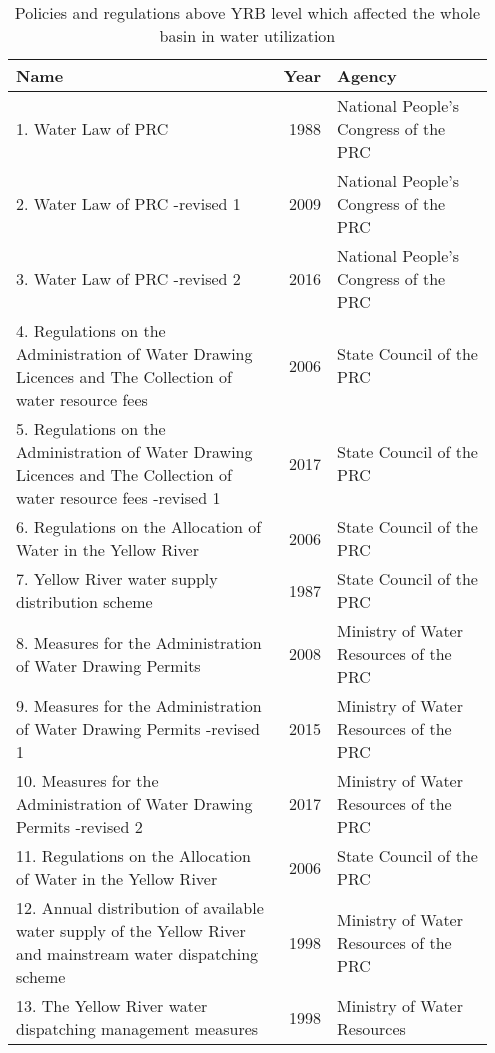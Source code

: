 \begin{table}[!h]
    \centering
    \renewcommand\arraystretch{1.2}
    \caption{Policies and regulations above YRB level which affected the whole basin in water utilization}\label{tab:policies}
    \begin{tabular}{p{0.6\linewidth}rp{0.35\linewidth}}
        Name & Year & Agency \\
        \hline
        1. Water Law of PRC & 1988 & National People's Congress of the PRC \\
        2. Water Law of PRC -revised 1 & 2009 & National People's Congress of the PRC \\
        3. Water Law of PRC -revised 2 & 2016 & National People's Congress of the PRC \\
        4. Regulations on the Administration of Water Drawing Licences and The Collection of water resource fees & 2006 & State Council of the PRC \\
        5. Regulations on the Administration of Water Drawing Licences and The Collection of water resource fees -revised 1 & 2017 & State Council of the PRC \\
        6. Regulations on the Allocation of Water in the Yellow River & 2006 & State Council of the PRC \\
        7. Yellow River water supply distribution scheme & 1987 & State Council of the PRC \\
        8. Measures for the Administration of Water Drawing Permits & 2008 & Ministry of Water Resources of the PRC \\
        9. Measures for the Administration of Water Drawing Permits -revised 1 & 2015 & Ministry of Water Resources of the PRC \\
        10. Measures for the Administration of Water Drawing Permits -revised 2 & 2017 & Ministry of Water Resources of the PRC \\
        11. Regulations on the Allocation of Water in the Yellow River & 2006 & State Council of the PRC \\
        12. Annual distribution of available water supply of the Yellow River and mainstream water dispatching scheme & 1998 & Ministry of Water Resources of the PRC \\
        13. The Yellow River water dispatching management measures & 1998 & Ministry of Water Resources \\

\end{tabular}
\end{table}
